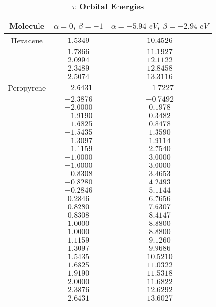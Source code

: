 \documentclass[9pt,twocolumn,twoside]{optica}
\begin{document}
\begin{table}[H]
\centering
\caption{\bf  $\pi$ Orbital Energies }
\begin{tabular}{ccc}
\hline
Molecule &$\alpha=0 $, $\beta=-1 $  & $\alpha=-5.94 \,\, eV $, $\beta=-2.94 \,\, eV $ \\
\hline
Hexacene	&   $ 1.5349 $        & $10.4526 $\\	
		&   $ 1.7866 $        & $11.1927 $\\
		&   $ 2.0994 $        & $12.1122 $\\
		&   $ 2.3489 $        & $12.8458 $\\
		&   $ 2.5074 $        & $13.3116 $\\
Peropyrene 	&   $-2.6431 $        & $-1.7227 $\\
		&   $-2.3876 $        & $-0.7492 $\\
		&   $-2.0000 $        & $ 0.1978 $\\
		&   $-1.9190 $        & $ 0.3482 $\\
		&   $-1.6825 $        & $ 0.8478 $\\ 
		&   $-1.5435 $        & $ 1.3590 $\\
		&   $-1.3097 $        & $ 1.9114 $\\
		&   $-1.1159 $        & $ 2.7540 $\\
		&   $-1.0000 $        & $ 3.0000 $\\
		&   $-1.0000 $        & $ 3.0000 $\\
		&   $-0.8308 $ 	      & $ 3.4653 $\\ 
		&   $-0.8280 $        & $ 4.2493 $\\
		&   $-0.2846 $        & $ 5.1144 $\\
		&   $ 0.2846 $        & $ 6.7656 $\\
		&   $ 0.8280 $        & $ 7.6307 $\\
		&   $ 0.8308 $        & $ 8.4147 $\\
		&   $ 1.0000 $        & $ 8.8800 $\\ 
		&   $ 1.0000 $        & $ 8.8800 $\\
		&   $ 1.1159 $        & $ 9.1260 $\\
		&   $ 1.3097 $        & $ 9.9686 $\\
		&   $ 1.5435 $        & $10.5210 $\\
		&   $ 1.6825 $        & $11.0322 $\\
		&   $ 1.9190 $ 	      & $11.5318 $\\ 
		&   $ 2.0000 $        & $11.6822 $\\
		&   $ 2.3876 $        & $12.6292 $\\
		&   $ 2.6431 $        & $13.6027 $\\		
\hline
\end{tabular}
  \label{tab:huck2}
\end{table}
\end{document}
